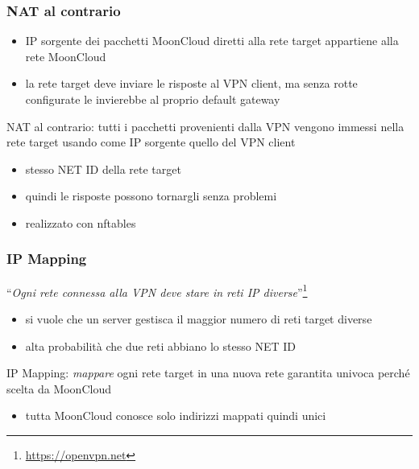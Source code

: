 \begin{frame}
	\frametitle{NAT al contrario}
		
	\begin{itemize}
		\item IP sorgente dei pacchetti MoonCloud diretti alla rete target
		      appartiene alla rete MoonCloud
		\item la rete target deve inviare le risposte al VPN client, ma senza
		      rotte configurate le invierebbe al proprio default gateway
	\end{itemize}
		
	\alert{NAT al contrario}: tutti i pacchetti provenienti dalla VPN vengono
	immessi nella rete target usando come IP sorgente quello del VPN client
	\begin{itemize}
		\item stesso NET ID della rete target
		\item quindi le risposte possono tornargli senza problemi
		\item realizzato con \alert{nftables}
	\end{itemize}
\end{frame}

\begin{frame}
	\frametitle{IP Mapping}
	``\textit{Ogni rete connessa alla VPN deve stare in reti IP diverse}''\footnote{\url{https://openvpn.net}}
	\begin{itemize}
		\item si vuole che un server gestisca il maggior numero di reti target diverse
		\item alta probabilità che due reti abbiano lo stesso NET ID
	\end{itemize}
		
	\alert{IP Mapping}: \textit{mappare} ogni rete target in una nuova rete
	\alert{garantita univoca} perché scelta da MoonCloud
	\begin{itemize}
		\item tutta MoonCloud conosce solo indirizzi mappati quindi unici
	\end{itemize}
\end{frame}

